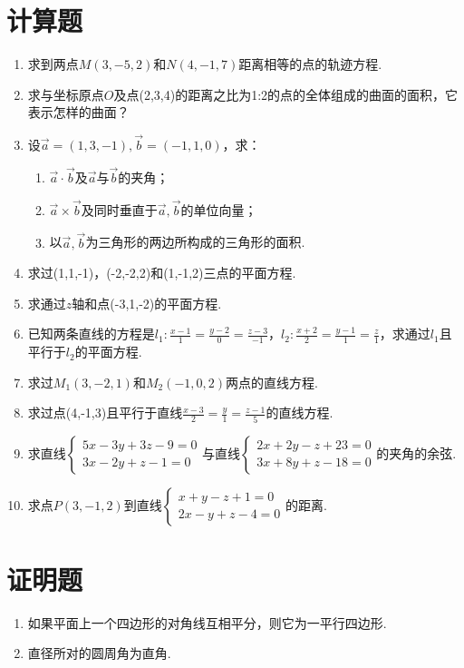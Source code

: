 \section{计算题}
\begin{enumerate}
	\item 求到两点$ M(3,-5,2) $和$ N(4,-1,7) $距离相等的点的轨迹方程.
	\item 求与坐标原点$ O $及点(2,3,4)的距离之比为1:2的点的全体组成的曲面的面积，它表示怎样的曲面？
	\item 设$ \vec{a}=(1,3,-1),\vec{b}=(-1,1,0) $，求：
		\begin{enumerate}[(1)]
			\item $\vec{a}\cdot\vec{b}$及$\vec{a}$与$\vec{b}$的夹角；
			\item $ \vec{a}\times\vec{b} $及同时垂直于$ \vec{a},\vec{b} $的单位向量；
			\item 以$\vec{a},\vec{b}$为三角形的两边所构成的三角形的面积.
		\end{enumerate}
	\item 求过(1,1,-1)，(-2,-2,2)和(1,-1,2)三点的平面方程.
	\item 求通过$ z $轴和点(-3,1,-2)的平面方程.
	\item 已知两条直线的方程是$ l_1:\frac{x-1}{1}=\frac{y-2}{0}=\frac{z-3}{-1} $，$ l_2:\frac{x+2}{2}=\frac{y-1}{1}=\frac{z}{1} $，求通过$ l_1 $且平行于$ l_2 $的平面方程.
	\item 求过$ M_1(3,-2,1) $和$ M_2(-1,0,2) $两点的直线方程.
	\item 求过点(4,-1,3)且平行于直线$ \frac{x-3}{2}=\frac{y}{1}=\frac{z-1}{5} $的直线方程.
	\item 求直线$ \begin{cases} 5x-3y+3z-9=0 \\ 3x-2y+z-1=0 \end{cases} $与直线$ \begin{cases} 2x+2y-z+23=0 \\ 3x+8y+z-18=0 \end{cases} $的夹角的余弦.
	\item 求点$ P(3,-1,2) $到直线$ \begin{cases} x+y-z+1=0 \\ 2x-y+z-4=0 \end{cases} $的距离.
\end{enumerate}
\section{证明题}
\begin{enumerate}
	\item 如果平面上一个四边形的对角线互相平分，则它为一平行四边形.
	\item 直径所对的圆周角为直角.
\end{enumerate}

